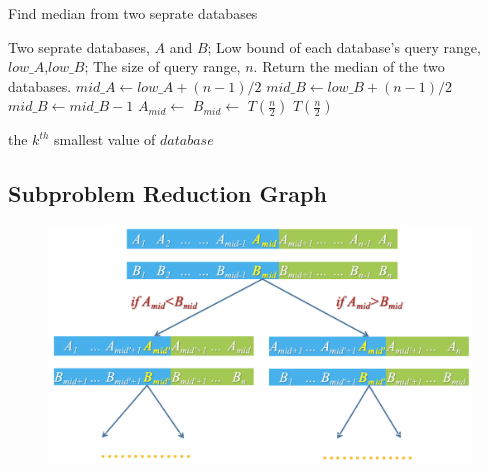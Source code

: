 \documentclass[UTF8,a4paper,12pt]{article}
\begin{document}
	\begin{algorithm}[htb]
		\caption{Find median from two seprate databases}
		\begin{algorithmic}[1]
			\Require
			Two seprate databases, $A$ and $B$;
			Low bound of each database's query range, $low\_A$,$low\_B$;
			The size of query range, $n$.
			\Ensure
			Return the median of the two databases.
				\State $mid\_A \gets low\_A + (n-1)/2 $
				\State $mid\_B \gets low\_B + (n-1)/2 $
				\  $mid\_B \gets mid\_B - 1$
				\EndIf
				\State $A_{mid} \gets $
				\State $B_{mid} \gets $
					\State \Return {}
					\State \Return {}
					\textbf{\color{red}$ T(\frac{n}{2}) $}
				\Else 
					\State \Return {}
					\textbf{\color{red}$ T(\frac{n}{2}) $}
				\EndIf
			\EndFunction
			\State
			
				\State \Return the $k^{th}$ smallest value of $database$
			\EndFunction
		\end{algorithmic}
	\end{algorithm}
	
	\subsection{Subproblem Reduction Graph}
	
	\begin{figure}[htb]
		\centering
		\includegraphics[width=.9\textwidth]{./pictures/alg1/problem1-1.png}
	\end{figure}
	
\end{document}
